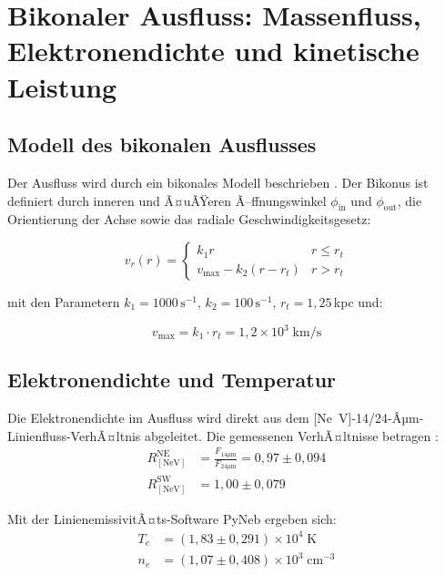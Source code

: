 ﻿\documentclass[12pt,a4paper]{report}
\begin{document}
\section{Bikonaler Ausfluss: Massenfluss, Elektronendichte und kinetische Leistung}

\subsection{Modell des bikonalen Ausflusses}

Der Ausfluss wird durch ein bikonales Modell beschrieben \cite{kader2026}. Der Bikonus ist definiert durch inneren und Ã¤uÃŸeren Ã–ffnungswinkel $\phi_\mathrm{in}$ und $\phi_\mathrm{out}$, die Orientierung der Achse sowie das radiale Geschwindigkeitsgesetz:

\begin{equation}
	v_r(r) = \begin{cases}
		k_1 r           & r \leq r_t \\
		v_\mathrm{max} - k_2(r - r_t) & r > r_t
	\end{cases}
\end{equation}

mit den Parametern $k_1 = 1000\,\text{s}^{-1}$, $k_2 = 100\,\text{s}^{-1}$, $r_t = 1{,}25$\,kpc und:

\begin{equation}
	\boxed{v_\mathrm{max} = k_1 \cdot r_t = 1{,}2 \times 10^3\;\text{km/s}}
\end{equation}

\subsection{Elektronendichte und Temperatur}

Die Elektronendichte im Ausfluss wird direkt aus dem [Ne~V]-14/24-Âµm-Linien\-fluss-VerhÃ¤ltnis abgeleitet. Die gemessenen VerhÃ¤ltnisse betragen \cite{kader2026}:
\begin{align}
	R_\mathrm{[NeV]}^\mathrm{NE} &= \frac{F_{14\mu\text{m}}}{F_{24\mu\text{m}}} = 0{,}97 \pm 0{,}094 \\
	R_\mathrm{[NeV]}^\mathrm{SW} &= 1{,}00 \pm 0{,}079
\end{align}

Mit der Linien\-emissivitÃ¤ts-Software PyNeb ergeben sich:
\begin{align}
	T_e &= (1{,}83 \pm 0{,}291) \times 10^4\;\text{K} \\
	n_e &= (1{,}07 \pm 0{,}408) \times 10^3\;\text{cm}^{-3}
\end{align}
\end{document}
